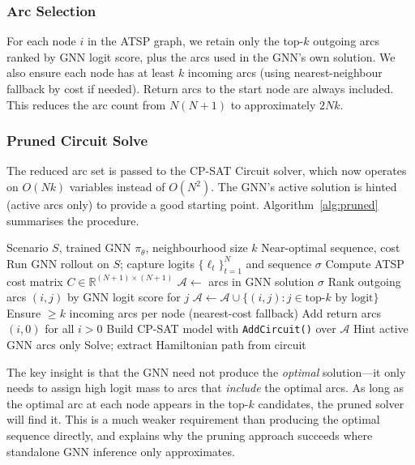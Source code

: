 \documentclass[conference]{IEEEtran}
\begin{document}
\subsubsection{Arc Selection}
For each node $i$ in the ATSP graph, we retain only the top-$k$ outgoing arcs ranked by GNN logit score, plus the arcs used in the GNN's own solution. We also ensure each node has at least $k$ incoming arcs (using nearest-neighbour fallback by cost if needed). Return arcs to the start node are always included. This reduces the arc count from $N(N{+}1)$ to approximately $2Nk$.

\subsubsection{Pruned Circuit Solve}
The reduced arc set is passed to the CP-SAT Circuit solver, which now operates on $O(Nk)$ variables instead of $O(N^2)$. The GNN's active solution is hinted (active arcs only) to provide a good starting point. Algorithm~\ref{alg:pruned} summarises the procedure.

\begin{algorithm}[htbp]
\caption{GNN-Guided Arc Pruning for ILP Acceleration}
\label{alg:pruned}
\begin{algorithmic}[1]
\REQUIRE Scenario $S$, trained GNN $\pi_\theta$, neighbourhood size $k$
\ENSURE Near-optimal sequence, cost
\STATE Run GNN rollout on $S$; capture logits $\{\ell_t\}_{t=1}^{N}$ and sequence $\sigma$
\STATE Compute ATSP cost matrix $C \in \mathbb{R}^{(N+1)\times(N+1)}$
\STATE $\mathcal{A} \leftarrow$ arcs in GNN solution $\sigma$
    \STATE Rank outgoing arcs $(i, j)$ by GNN logit score for $j$
    \STATE $\mathcal{A} \leftarrow \mathcal{A} \cup \{(i,j) : j \in \text{top-}k\text{ by logit}\}$
\ENDFOR
\STATE Ensure $\geq k$ incoming arcs per node (nearest-cost fallback)
\STATE Add return arcs $(i, 0)$ for all $i > 0$
\STATE Build CP-SAT model with \texttt{AddCircuit()} over $\mathcal{A}$
\STATE Hint active GNN arcs only
\STATE Solve; extract Hamiltonian path from circuit
\end{algorithmic}
\end{algorithm}

The key insight is that the GNN need not produce the \emph{optimal} solution---it only needs to assign high logit mass to arcs that \emph{include} the optimal arcs. As long as the optimal arc at each node appears in the top-$k$ candidates, the pruned solver will find it. This is a much weaker requirement than producing the optimal sequence directly, and explains why the pruning approach succeeds where standalone GNN inference only approximates.
\end{document}
